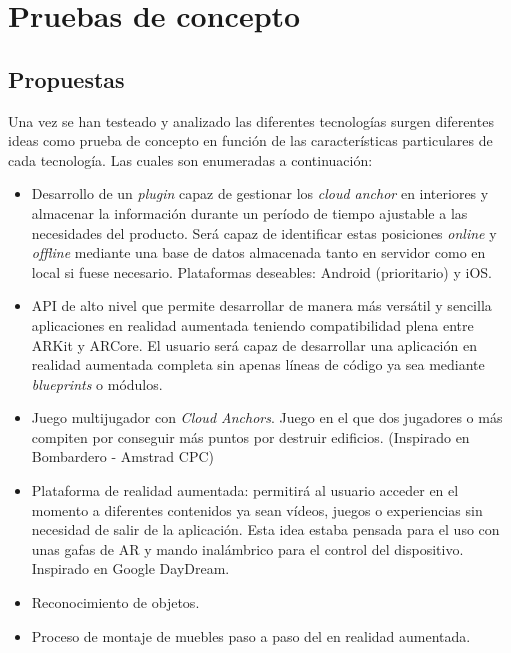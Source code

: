 \chapter{Pruebas de concepto}
\section{Propuestas}
Una vez se han testeado y analizado las diferentes tecnologías surgen diferentes ideas como prueba de concepto en función de las características particulares de cada tecnología. Las cuales son enumeradas a continuación:

\begin{itemize}
\item Desarrollo de un \textit{plugin} capaz de gestionar los \textit{cloud anchor} en interiores y almacenar la información durante un período de tiempo ajustable a las necesidades del producto. Será capaz de identificar estas posiciones \textit{online} y \textit{offline} mediante una base de datos almacenada tanto en servidor como en local si fuese necesario. Plataformas deseables: Android (prioritario) y iOS. 
\item API de alto nivel que permite desarrollar de manera más versátil y sencilla aplicaciones en realidad aumentada teniendo compatibilidad plena entre ARKit y ARCore. El usuario será capaz de desarrollar una aplicación en realidad aumentada completa sin apenas líneas de código ya sea mediante \textit{blueprints} o módulos.
\item Juego multijugador con \textit{Cloud Anchors}. Juego en el que dos jugadores o más compiten por conseguir más puntos por destruir edificios. (Inspirado en Bombardero - Amstrad CPC)
\item Plataforma de realidad aumentada: permitirá al usuario acceder en el momento a diferentes contenidos ya sean vídeos, juegos o experiencias sin necesidad de salir de la aplicación. Esta idea estaba pensada para el uso con unas gafas de AR y mando inalámbrico para el control del dispositivo. Inspirado en Google DayDream.
\item Reconocimiento de objetos.
\item Proceso de montaje de muebles paso a paso del en realidad aumentada.
\end{itemize}


